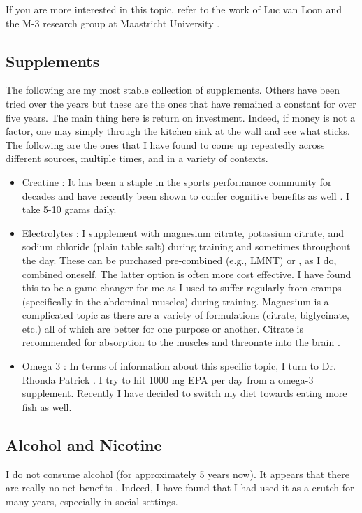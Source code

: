 \documentclass[10pt,twocolumn]{extarticle}
\begin{document}
If you are more interested in this topic, refer to the work of Luc van Loon and the M-3 research group at Maastricht University \cite{M3_Research_Publications,youtube_muscle_protein}.

\subsection{Supplements}

The following are my most stable collection of supplements. Others have been tried over the years but these are the ones that have remained a constant for over five years. The main thing here is return on investment. Indeed, if money is not a factor, one may simply through the kitchen sink at the wall and see what sticks. The following are the ones that I have found to come up repeatedly across different sources, multiple times, and in a variety of contexts.

\begin{itemize}
    \item Creatine : It has been a staple in the sports performance community for decades \cite{rawson2003effects} and have recently been shown to confer cognitive benefits as well \cite{avgerinos2018effects}. I take 5-10 grams daily.
    \item Electrolytes : I supplement with magnesium citrate, potassium citrate, and sodium chloride (plain table salt) during training and sometimes throughout the day. These can be purchased pre-combined (e.g., LMNT) or , as I do, combined oneself. The latter option is often more cost effective. I have found this to be a game changer for me as I used to suffer regularly from cramps (specifically in the abdominal muscles) during training. Magnesium is a complicated topic as there are a variety of formulations (citrate, biglycinate, etc.) all of which are better for one purpose or another. Citrate is recommended for absorption to the muscles \cite{ates2019dose} and threonate into the brain \cite{vink2016magnesium}.
    \item Omega 3 : In terms of information about this specific topic, I turn to Dr. Rhonda Patrick \cite{youtube_omega3}. I try to hit 1000 mg EPA per day from a omega-3 supplement. Recently I have decided to switch my diet towards eating more fish as well.
\end{itemize}

\subsection{Alcohol and Nicotine}
I do not consume alcohol (for approximately 5 years now). It appears that there are really no net benefits \cite{huberman_alcohol_body_brain}. Indeed, I have found that I had used it as a crutch for many years, especially in social settings.
\end{document}
